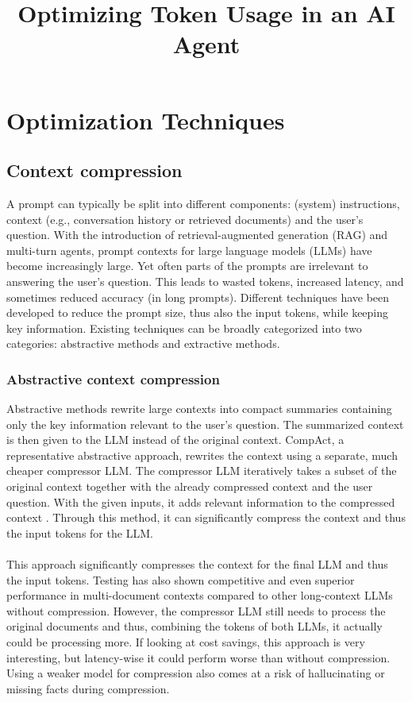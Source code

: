 \documentclass[pdflatex,sn-mathphys-num,oneside]{sn-jnl}%
\theoremstyle{thmstyleone}%
\theoremstyle{thmstyletwo}%
\theoremstyle{thmstylethree}%
\begin{document}
\title[Article Title]{Optimizing Token Usage in an AI Agent}
\author{ }
\maketitle

\section{Optimization Techniques}\label{sec1}

\subsection{Context compression}
A prompt can typically be split into different components: (system) instructions, context (e.g., conversation history or retrieved documents) and the user's question. 
With the introduction of retrieval-augmented generation (RAG)\cite{RAG} and multi-turn agents, prompt contexts for large language models (LLMs) have become increasingly large.
Yet often parts of the prompts are irrelevant to answering the user's question. This leads to wasted tokens, increased latency, and sometimes reduced accuracy (in long prompts). 
Different techniques have been developed to reduce the prompt size, thus also the input tokens, while keeping key information. 
Existing techniques can be broadly categorized into two categories: abstractive methods and extractive methods. 

\subsubsection{Abstractive context compression}
Abstractive methods rewrite large contexts into compact summaries containing only the key information relevant to the user's question. 
The summarized context is then given to the LLM instead of the original context. 
CompAct, a representative abstractive approach, rewrites the context using a separate, much cheaper compressor LLM. 
The compressor LLM iteratively takes a subset of the original context together with the already compressed context and the user question. 
With the given inputs, it adds relevant information to the compressed context \cite{compact}. 
Through this method, it can significantly compress the context and thus the input tokens for the LLM. 
\\ \\
This approach significantly compresses the context for the final LLM and thus the input tokens. 
Testing has also shown competitive and even superior performance in multi-document contexts compared to other long-context LLMs without compression\cite{compact}.
However, the compressor LLM still needs to process the original documents and thus, combining the tokens of both LLMs, it actually could be processing more. 
If looking at cost savings, this approach is very interesting, but latency-wise it could perform worse than without compression. 
Using a weaker model for compression also comes at a risk of hallucinating or missing facts during compression.
\end{document}
